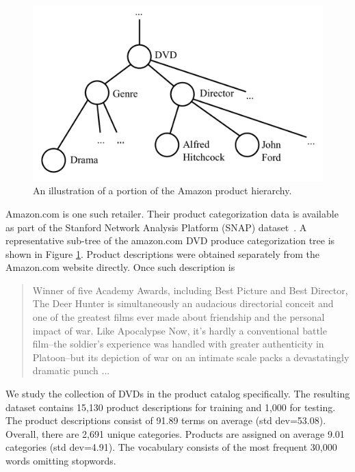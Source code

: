 \begin{figure}[t]
\centering \includegraphics[scale=0.4]{Chapters/chapter1/figures/hi_quality_product_tree_cropped} \caption{An illustration of a portion of the Amazon product hierarchy.}
\label{fig:product_tree}
\end{figure}


Amazon.com is one such retailer.  Their product categorization data is available as part of the 
 Stanford Network Analysis Platform (SNAP) dataset~\cite{SNAP}.    A representative sub-tree of the amazon.com DVD produce categorization tree is shown in Figure \ref{fig:product_tree}.  
Product descriptions were obtained separately from the
Amazon.com website directly. Once such description is
\begin{quote}
{Winner of five Academy Awards, including Best Picture and Best Director, The Deer Hunter 
is simultaneously an audacious directorial conceit and one of the greatest films ever made 
about friendship and the personal impact of war. Like Apocalypse Now, it's hardly a conventional 
battle film--the soldier's experience was handled with greater authenticity in Platoon--but its 
depiction of war on an intimate scale packs a devastatingly dramatic punch ... }
\end{quote}
We study the collection of DVDs
in the product catalog specifically.
The resulting dataset contains 15,130 product descriptions for training and 1,000
for testing. The product descriptions consist of
91.89 terms on average (std dev=53.08). Overall, there are 2,691 unique categories.
Products are assigned on average 9.01 categories (std dev=4.91). The vocabulary
consists of the most frequent 30,000 words omitting stopwords. 

